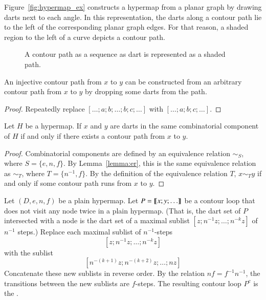 \begin{remark}
 Figure~\ref{fig:hypermap_ex}
  constructs a hypermap from a planar graph by drawing darts next to
  each angle.  In this representation, the darts along a contour path
  lie to the left of the corresponding planar graph edges.  For that
  reason, a shaded region to the left of a curve depicts a contour
  path.
\end{remark}

\begin{figure}[htb]
\centering
{}
\caption{A contour path as a sequence as dart is represented as a
shaded path.}
\label{fig:shade-dart}
\end{figure}

\begin{lemma} 
An injective contour path from
  $x$ to $y$ can be constructed from an arbitrary contour path from
  $x$ to $y$ by dropping some darts from the path.
\end{lemma}

\begin{proof} Repeatedly replace $[\ldots;a;b;\ldots;b;c;\ldots]$ with
$[\ldots;a;b;c;\ldots]$.
\end{proof}





\begin{lemma}\label{lemma:connect-contour}  
Let $H$ be a hypermap.
If $x$ and $y$ are darts in the same combinatorial component of $H$ if and only if
there exists a contour path from $x$ to $y$.
\end{lemma}

\begin{proof} 
Combinatorial components are defined by an equivalence relation $\sim_S$, where
$S = \{e,n,f\}$.  By Lemma~\ref{lemma:er}, this is the same equivalence relation as
$\sim_T$, where $T = \{n^{-1},f\}$.  By the definition of the equivalence relation $T$,
$x\sim_T y$ if and only if some contour path runs from $x$ to $y$.
\end{proof}
%

\begin{definition}[complement] 
Let $(D,e,n,f)$ be a plain hypermap.
Let $P={\llbracket{x;y;\ldots}\rrbracket}$ be a contour loop that does not visit any node
twice in a plain hypermap.   (That is, the dart set of $P$ intersected with a node
is the dart set of a maximal sublist $[z;n^{-1}z;\ldots;n^{-k}z]$ of $n^{-1}$ steps.)
 Replace each maximal sublist of
$n^{-1}$-steps
\[ 
[z;n^{-1} z; \ldots; n^{-k} z]
\] 
with the sublist
\[ 
[n^{-(k+1)} z;n^{-(k+2)} z;\ldots; n z]
\] 
Concatenate these new sublists in reverse order.  By the relation $n f = f^{-1} n^{-1}$,
the transitions between the new sublists are $f$-steps.
The resulting contour loop $P^c$
is the . 
\end{definition}

